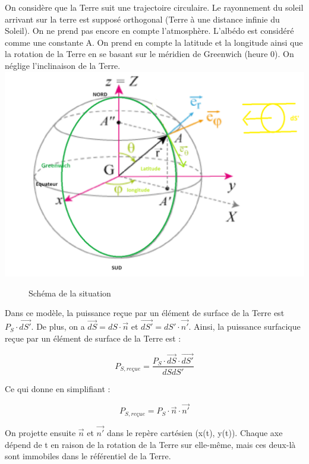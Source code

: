 \documentclass[a4paper,11pt]{article}
\begin{document}
On considère que la Terre suit une trajectoire circulaire. Le rayonnement du soleil arrivant sur la terre est supposé orthogonal (Terre à une distance infinie du Soleil). On ne prend pas encore en compte l’atmosphère. L’albédo est considéré comme une constante A. On prend en compte la latitude et la longitude ainsi que la rotation de la Terre en se basant sur le méridien de Greenwich (heure 0). On néglige l'inclinaison de la Terre. \\

\begin{adjustbox}{center}
\includegraphics[scale=0.32]{Rayons_terre}
\end{adjustbox}
\begin{figure}[h]
  \centering
  \caption{Schéma de la situation}
\end{figure}


Dans ce modèle, la puissance reçue par un élément de surface de la Terre est $P_S \cdot \overrightarrow{dS'}$. De plus, on a $\overrightarrow{dS} = dS \cdot \vec{n}$ et $\overrightarrow{dS'} = dS' \cdot \vec{n'}$. Ainsi, la puissance surfacique reçue par un élément de surface de la Terre est :

\[ P_{S, reçue} = \dfrac{P_S \cdot \overrightarrow{dS} \cdot \overrightarrow{dS'}}{dSdS'} \]

Ce qui donne en simplifiant :

\[ P_{S,reçue} = P_S \cdot \vec{n} \cdot \vec{n'} \]

On projette ensuite $\vec{n}$ et $\vec{n'}$ dans le repère cartésien (x(t), y(t)). Chaque axe dépend de t en raison de la rotation de la Terre sur elle-même, mais ces deux-là sont immobiles dans le référentiel de la Terre.
\end{document}
